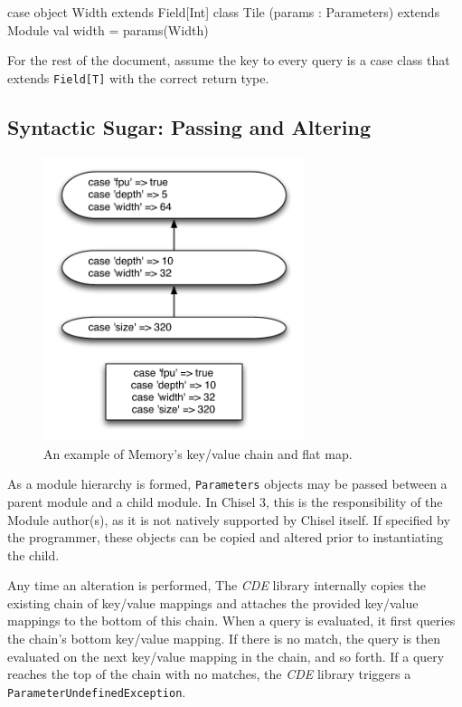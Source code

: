 \documentclass[10pt,twocolumn]{article}
\def\code#1{{\small\tt #1}}
\begin{document}
\begin{scala}
case object Width extends Field[Int]
class Tile (params : Parameters) extends Module { 
  val width = params(Width) 
}
\end{scala}

For the rest of the document, assume the key to every query is a case class that extends \code{Field[T]} with the correct return type.

\subsection{Syntactic Sugar: Passing and Altering}

\begin{figure}[h]
\centering
\includegraphics[width=3in]{figs/alter.pdf}
\caption{An example of Memory's key/value chain and flat map.}
\label{fig:alter}
\end{figure}

As a module hierarchy is formed, \code{Parameters} objects may be
passed between a parent module and a child module. In Chisel 3, this
is the responsibility of the Module author(s), as it is not natively
supported by Chisel itself.
If specified by the programmer, these objects can be copied and altered prior to instantiating the child.

Any time an alteration is performed,
The {\em CDE} library internally copies the existing chain of
key/value mappings and attaches the provided key/value mappings to the
bottom of this chain. When a query is evaluated, it first queries the
chain's bottom key/value mapping. If there is no match, the query is
then evaluated on the next key/value mapping in the chain, and so
forth. If a query reaches the top of the chain with no matches,
the {\em CDE} library
triggers a \code{ParameterUndefinedException}.
\end{document}
